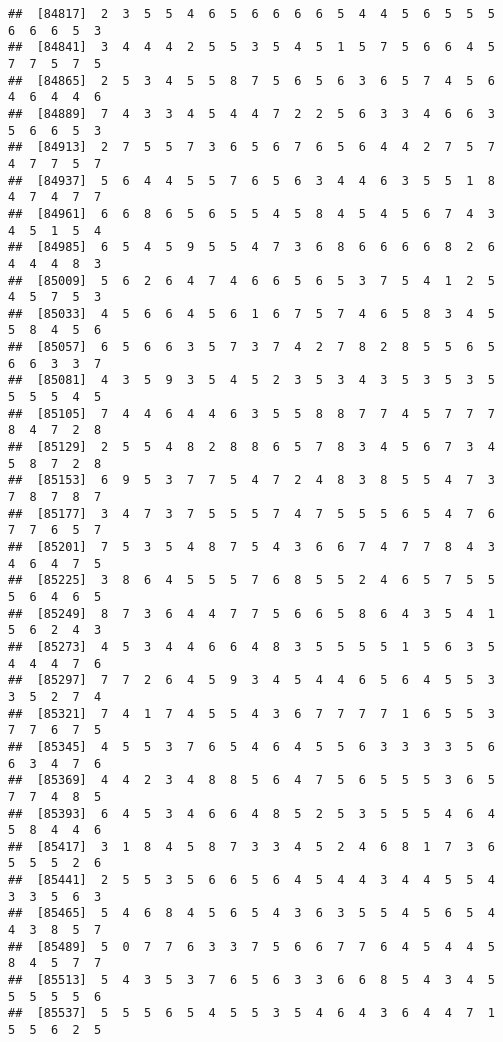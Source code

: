 \documentclass[
]{book}
\begin{document}
\begin{verbatim}
##  [84817]  2  3  5  5  4  6  5  6  6  6  6  5  4  4  5  6  5  5  5  6  6  6  5  3
##  [84841]  3  4  4  4  2  5  5  3  5  4  5  1  5  7  5  6  6  4  5  7  7  5  7  5
##  [84865]  2  5  3  4  5  5  8  7  5  6  5  6  3  6  5  7  4  5  6  4  6  4  4  6
##  [84889]  7  4  3  3  4  5  4  4  7  2  2  5  6  3  3  4  6  6  3  5  6  6  5  3
##  [84913]  2  7  5  5  7  3  6  5  6  7  6  5  6  4  4  2  7  5  7  4  7  7  5  7
##  [84937]  5  6  4  4  5  5  7  6  5  6  3  4  4  6  3  5  5  1  8  4  7  4  7  7
##  [84961]  6  6  8  6  5  6  5  5  4  5  8  4  5  4  5  6  7  4  3  4  5  1  5  4
##  [84985]  6  5  4  5  9  5  5  4  7  3  6  8  6  6  6  6  8  2  6  4  4  4  8  3
##  [85009]  5  6  2  6  4  7  4  6  6  5  6  5  3  7  5  4  1  2  5  4  5  7  5  3
##  [85033]  4  5  6  6  4  5  6  1  6  7  5  7  4  6  5  8  3  4  5  5  8  4  5  6
##  [85057]  6  5  6  6  3  5  7  3  7  4  2  7  8  2  8  5  5  6  5  6  6  3  3  7
##  [85081]  4  3  5  9  3  5  4  5  2  3  5  3  4  3  5  3  5  3  5  5  5  5  4  5
##  [85105]  7  4  4  6  4  4  6  3  5  5  8  8  7  7  4  5  7  7  7  8  4  7  2  8
##  [85129]  2  5  5  4  8  2  8  8  6  5  7  8  3  4  5  6  7  3  4  5  8  7  2  8
##  [85153]  6  9  5  3  7  7  5  4  7  2  4  8  3  8  5  5  4  7  3  7  8  7  8  7
##  [85177]  3  4  7  3  7  5  5  5  7  4  7  5  5  5  6  5  4  7  6  7  7  6  5  7
##  [85201]  7  5  3  5  4  8  7  5  4  3  6  6  7  4  7  7  8  4  3  4  6  4  7  5
##  [85225]  3  8  6  4  5  5  5  7  6  8  5  5  2  4  6  5  7  5  5  5  6  4  6  5
##  [85249]  8  7  3  6  4  4  7  7  5  6  6  5  8  6  4  3  5  4  1  5  6  2  4  3
##  [85273]  4  5  3  4  4  6  6  4  8  3  5  5  5  5  1  5  6  3  5  4  4  4  7  6
##  [85297]  7  7  2  6  4  5  9  3  4  5  4  4  6  5  6  4  5  5  3  3  5  2  7  4
##  [85321]  7  4  1  7  4  5  5  4  3  6  7  7  7  7  1  6  5  5  3  7  7  6  7  5
##  [85345]  4  5  5  3  7  6  5  4  6  4  5  5  6  3  3  3  3  5  6  6  3  4  7  6
##  [85369]  4  4  2  3  4  8  8  5  6  4  7  5  6  5  5  5  3  6  5  7  7  4  8  5
##  [85393]  6  4  5  3  4  6  6  4  8  5  2  5  3  5  5  5  4  6  4  5  8  4  4  6
##  [85417]  3  1  8  4  5  8  7  3  3  4  5  2  4  6  8  1  7  3  6  5  5  5  2  6
##  [85441]  2  5  5  3  5  6  6  5  6  4  5  4  4  3  4  4  5  5  4  3  3  5  6  3
##  [85465]  5  4  6  8  4  5  6  5  4  3  6  3  5  5  4  5  6  5  4  4  3  8  5  7
##  [85489]  5  0  7  7  6  3  3  7  5  6  6  7  7  6  4  5  4  4  5  8  4  5  7  7
##  [85513]  5  4  3  5  3  7  6  5  6  3  3  6  6  8  5  4  3  4  5  5  5  5  5  6
##  [85537]  5  5  5  6  5  4  5  5  3  5  4  6  4  3  6  4  4  7  1  5  5  6  2  5

\end{verbatim}
\end{document}
